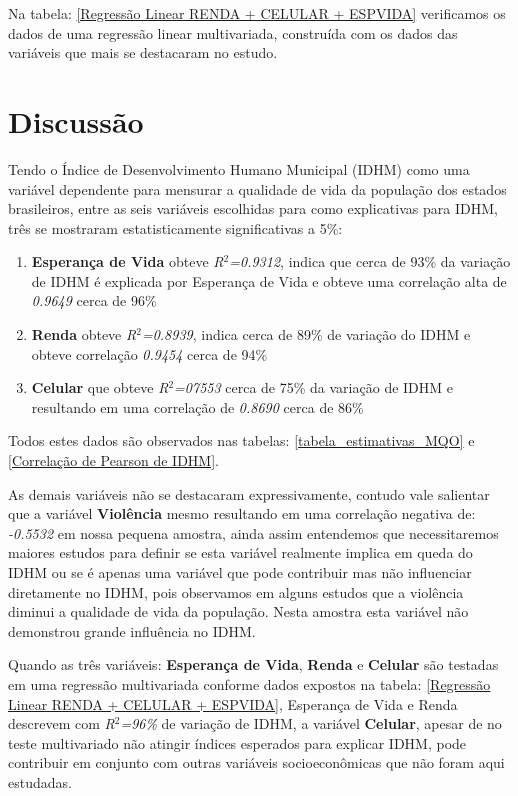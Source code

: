 \documentclass[journal]{IEEEtran}
\begin{document}
Na tabela: \ref{Regressão Linear RENDA + CELULAR + ESPVIDA} verificamos os dados de uma regressão linear multivariada, construída com os dados das variáveis que mais se destacaram no estudo.

\section{Discussão}

Tendo o Índice de Desenvolvimento Humano Municipal (IDHM) como uma variável dependente para mensurar a qualidade de vida da população dos estados brasileiros, entre as seis variáveis escolhidas para como explicativas para IDHM, três se mostraram estatisticamente significativas a 5\%: 
\begin{enumerate}
\item {\textbf{Esperança de Vida} obteve \emph{R$^2$=0.9312}, indica que cerca de 93\% da variação de IDHM é explicada por Esperança de Vida e obteve uma correlação alta de \emph{0.9649} cerca de 96\%}
\item {\textbf{Renda} obteve \emph{R$^2$=0.8939}, indica cerca de 89\% de variação do IDHM e obteve correlação \emph{0.9454} cerca de 94\%}
\item {\textbf{Celular} que obteve \emph{R$^2$=07553} cerca de 75\% da variação de IDHM e resultando em uma correlação de \emph{0.8690} cerca de 86\%}
\end{enumerate}
Todos estes dados são observados nas tabelas: \ref{tabela_estimativas_MQO} e \ref{Correlação de Pearson de IDHM}.

As demais variáveis não se destacaram expressivamente, contudo vale salientar que a variável \textbf{Violência} mesmo resultando em uma correlação negativa de: \emph{-0.5532} em nossa pequena amostra, ainda assim entendemos que necessitaremos maiores estudos para definir se esta variável realmente implica em queda do IDHM ou se é apenas uma variável que pode contribuir mas não influenciar diretamente no IDHM, pois observamos em alguns estudos\cite{Ferreira2015}\cite{Cruz2016}\cite{Luciana2007}\cite{loureiroimpacto} que a violência diminui a qualidade de vida da população. Nesta amostra esta variável não demonstrou grande influência no IDHM.

Quando as três variáveis: \textbf{Esperança de Vida}, \textbf{Renda} e \textbf{Celular} são testadas em uma regressão multivariada conforme dados expostos na tabela: \ref{Regressão Linear RENDA + CELULAR + ESPVIDA}, Esperança de Vida e Renda descrevem com \emph{R$^2$=96\%} de variação de IDHM, a variável \textbf{Celular}, apesar de no teste multivariado não atingir índices esperados para explicar IDHM, pode contribuir em conjunto com outras variáveis socioeconômicas que não foram aqui estudadas.
\end{document}
